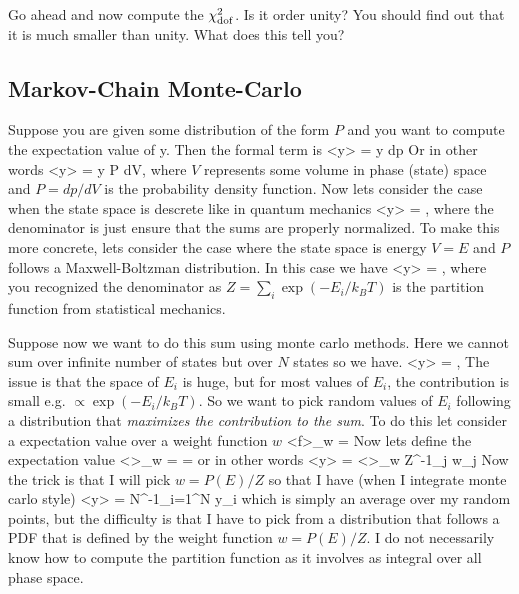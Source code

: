 Go ahead and now compute the $\chi_{\rm dof}^2$.  Is it order unity?  You should find out that it is much smaller than unity.  What does this tell you?

\subsection{Markov-Chain Monte-Carlo}

Suppose you are given some distribution of the form $P$ and you want to compute the expectation value of y.  Then the formal term is 
\be
\left<y\right> = \int y dp
\ee
Or in other words 
\be
\left<y\right> = \int y P dV,
\ee
where $V$ represents some volume in phase (state) space and $P= dp/dV$ is the probability density function.  Now lets consider the case when the state space is descrete like in quantum mechanics 
\be
\left<y\right> = ,
\ee
where the denominator is just ensure that the sums are properly normalized.  To make this more concrete, lets consider the case where the state space is energy $V=E$ and $P$ follows a Maxwell-Boltzman distribution.  In this case we have
\be
\left<y\right> = ,
\ee
where you recognized the denominator as $Z = \sum_i \exp(-E_i/k_BT)$ is the partition function from statistical mechanics.  

Suppose now we want to do this sum using monte carlo methods.  Here we cannot sum over infinite number of states but over $N$ states so we have. 
\be
\left<y\right> = ,
\ee
The issue is that the space of $E_i$ is huge, but for most values of $E_i$, the contribution is small e.g. $\propto \exp(-E_i/k_BT)$.  So we want to pick random values of $E_i$ following a distribution that {\it maximizes the contribution to the sum}.  To do this let consider a expectation value over a weight function $w$
\be
\left<f\right>_w = 
\ee
Now lets define the expectation value
\be
\left<\right>_w =  = 
\ee
or in other words 
\be
\left<y\right> = \left<\right>_w Z^{-1}\sum_j w_j
\ee
Now the trick is that I will pick $w = P(E)/Z$ so that I have (when I integrate monte carlo style) 
\be
\left<y\right> = N^{-1}\sum_{i=1}^N y_i
\ee
which is simply an average over my random points, but the difficulty is that I have to pick from a distribution that follows a PDF that is defined by the weight function $w = P(E)/Z$.  I do not necessarily know how to compute the partition function as it involves as integral over all phase space.  

